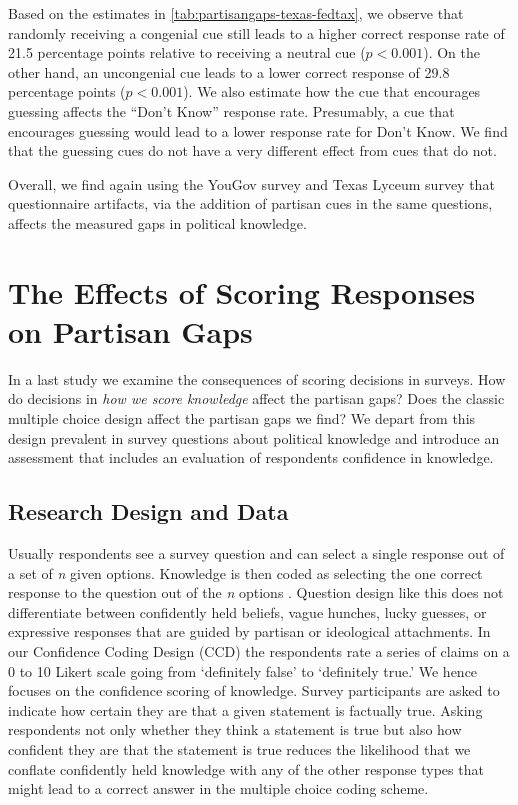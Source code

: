 \documentclass[12pt, letterpaper]{article}
\begin{document}
	Based on the estimates in \cref{tab:partisangaps-texas-fedtax}, we observe that randomly receiving a congenial cue still leads to a higher correct response rate of 21.5 percentage points relative to receiving a neutral cue ($p<0.001$). On the other hand, an uncongenial cue leads to a lower correct response of 29.8 percentage points ($p<0.001$).
	We also estimate how the cue that encourages guessing affects the ``Don't Know'' response rate. Presumably, a cue that encourages guessing would lead to a lower response rate for Don't Know. We find that the guessing cues do not have a very different effect from cues that do not. 
	
	Overall, we find again using the YouGov survey and Texas Lyceum survey that questionnaire artifacts, via the addition of partisan cues in the same questions, affects the measured gaps in political knowledge. 
	
	
	
	\section*{The Effects of Scoring Responses on Partisan Gaps}
	\label{sec:confidence_coding}
	
	In a last study we examine the consequences of scoring decisions in surveys. How do decisions in \emph{how we score knowledge} affect the partisan gaps? Does the classic multiple choice design affect the partisan gaps we find? We depart from this design prevalent in survey questions about political knowledge and introduce an assessment that includes an evaluation of respondents confidence in knowledge.
	
	
	\subsection*{Research Design and Data}\label{sec:data3}
	
	Usually respondents see a survey question and can select a single response out of a set of \emph{n} given options. Knowledge is then coded as selecting the one correct response to the question out of the \emph{n} options \citep[see, for example,][]{plescia2021enemy}. Question design like this does not differentiate between confidently held beliefs, vague hunches, lucky guesses, or expressive responses that are guided by partisan or ideological attachments. In our Confidence Coding Design (CCD) the respondents rate a series of claims on a 0 to 10 Likert scale going from `definitely false' to `definitely true.' We hence focuses on the confidence scoring of knowledge. Survey participants are asked to indicate how certain they are that a given statement is factually true. Asking respondents not only whether they think a statement is true but also how confident they are that the statement is true reduces the likelihood that we conflate confidently held knowledge with any of the other response types that might lead to a correct answer in the multiple choice coding scheme.
	
\end{document}
